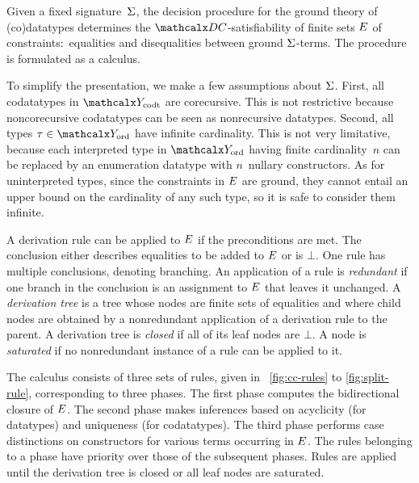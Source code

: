 Given a fixed signature~$\mathrm{\Sigma}$,
the decision procedure for the ground theory of (co)datatypes %
determines the
$\thD$-satisfiability of finite sets $E$ of constraints:\ equalities
and disequalities between ground $\mathrm{\Sigma}$-terms. The procedure is formulated as a
calculus.

To simplify the presentation, we make a few assumptions about
$\mathrm{\Sigma}$.
First, all codatatypes in $\Codata$ are corecursive. This is not restrictive
because noncorecursive codatatypes can be seen as nonrecursive
datatypes.
Second, all types $\tau \in \Nondata$ have infinite cardinality.
This is not very limitative, because each interpreted type in $\Nondata$
having finite cardinality~$n$
can be replaced by an enumeration datatype with $n$~nullary constructors.
As for uninterpreted types, since the constraints in $E$ are ground, they cannot entail an upper
bound on the cardinality of any such type, so it is safe to consider them infinite.


{
A derivation rule can be applied to $E$ if %
the %
preconditions are met.
The conclusion either describes equalities to be added to $E$
or is $\bot$. %
One rule has multiple conclusions, %
denoting branching.
%
An application of a rule is \emph{redundant} if one branch in the
conclusion is an assignment to $E$ that leaves it unchanged.
A \emph{derivation tree} is a %
tree whose nodes are finite sets of
equalities and where child nodes are obtained by a nonredundant application of a
derivation rule to the parent. A derivation tree is \emph{closed} if all of
its leaf nodes are $\bot$. A node is \emph{saturated} if no nonredundant
instance of a rule can be applied to it.

}

The calculus consists of three sets of rules, given in
\figuresname~\ref{fig:cc-rules} to \ref{fig:split-rule}, corresponding to three
phases. The first phase computes the bidirectional closure of $E$. The second
phase makes inferences based on acyclicity (for datatypes) and uniqueness
(for codatatypes).
The third phase performs case distinctions on constructors for
various terms occurring in $E$.
%
The rules belonging to a phase have priority over those of the subsequent
phases. Rules are applied until the derivation tree is closed or all leaf nodes
are saturated.

